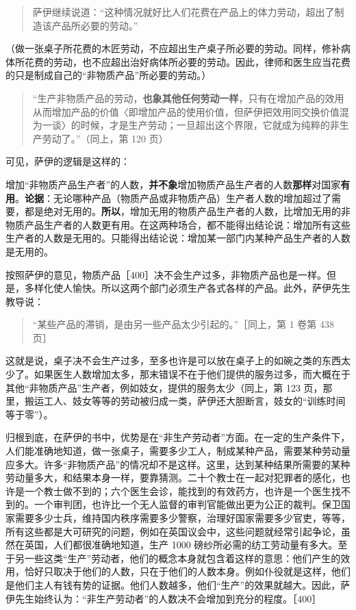 \begin{quote}萨伊继续说道：“这种情况就好比人们花费在产品上的体力劳动，超出了制造该产品所必要的劳动。”\end{quote}

（做一张桌子所花费的木匠劳动，不应超出生产桌子所必要的劳动。同样，修补病体所花费的劳动，也不应超出治好病体所必要的劳动。因此，律师和医生应当花费的只是制成自己的“非物质产品”所必要的劳动。）

\begin{quote}“生产非物质产品的劳动，\textbf{也象其他任何劳动一样}，只有在增加产品的效用从而增加产品的价值〈即增加产品的使用价值，但萨伊把效用同交换价值混为一谈〉的时候，才是生产劳动；一旦超出这个界限，它就成为纯粹的非生产劳动了。”（同上，第 120 页）\end{quote}

可见，萨伊的逻辑是这样的：

增加“非物质产品生产者”的人数，\textbf{并不象}增加物质产品生产者的人数\textbf{那样}对国家\textbf{有用}。\textbf{论据}：无论哪种产品（物质产品或非物质产品）生产者人数的增加超过了需要，都是绝对无用的。\textbf{所以}，增加无用的物质产品生产者的人数，比增加无用的非物质产品生产者的人数更有用。在这两种场合，都不能得出结论说：增加所有这些生产者的人数是无用的。只能得出结论说：增加某一部门内某种产品生产者的人数是无用的。

按照萨伊的意见，物质产品［400］决不会生产过多，非物质产品也是一样。但是，多样化使人愉快。所以这两个部门必须生产各式各样的产品。此外，萨伊先生教导说：

\begin{quote}“某些产品的滞销，是由另一些产品太少引起的。”［同上，第 1 卷第 438 页］\end{quote}

这就是说，桌子决不会生产过多，至多也许是可以放在桌子上的如碗之类的东西太少了。如果医生人数增加太多，那末错误不在于他们提供的服务过多，而大概在于其他“非物质产品”生产者，例如妓女，提供的服务太少（同上，第 123 页，那里，搬运工人、妓女等等的劳动被归成一类，萨伊还大胆断言，妓女的“训练时间等于零”）。

归根到底，在萨伊的书中，优势是在“非生产劳动者”方面。在一定的生产条件下，人们能准确地知道，做一张桌子，需要多少工人，制成某种产品，需要某种劳动量应多大。许多“非物质产品”的情况却不是这样。这里，达到某种结果所需要的某种劳动量多大，和结果本身一样，要靠猜测。二十个教士在一起对犯罪者的感化，也许是一个教士做不到的；六个医生会诊，能找到的有效药方，也许是一个医生找不到的。一个审判团，也许比一个无人监督的审判官能做出更为公正的裁判。保卫国家需要多少士兵，维持国内秩序需要多少警察，治理好国家需要多少官吏，等等，所有这些都是大可研究的问题，例如在英国议会中，这些问题就经常引起争论，虽然在英国，人们都很准确地知道，生产 1000 磅纱所必需的纺工劳动量有多大。至于另一些这类“生产”劳动者，他们的概念本身就包含着这样的意思：他们产生的效用，恰好只取决于他们的人数，只在于他们的人数本身。例如仆役就是这样，他们是他们主人有钱有势的证据。他们人数越多，他们“生产”的效果就越大。因此，萨伊先生始终认为：“非生产劳动者”的人数决不会增加到充分的程度。［400］

